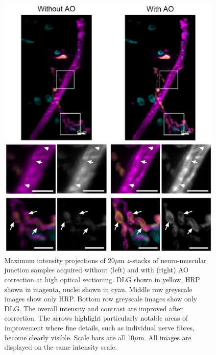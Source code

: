 \begin{figure}[h]
	\centering
	\includegraphics[width=\textwidth]{images/Aurox_NMJ_composite_grey_and_color.jpg}
	\caption[\textit{Drosophila} neuro-muscular junction data acquired on the Aurox imaging 
		system]{Maximum intensity projections of 20$\mu$m $z$-stacks of 
		neuro-muscular junction samples acquired without (left) and with 
		(right) AO correction at high optical sectioning. 
		DLG shown in yellow, HRP shown in magenta, nuclei shown in cyan. 
		Middle row greyscale images show only HRP. Bottom row greyscale 
		images show only DLG. The overall intensity and contrast are 
		improved after correction. The arrows highlight particularly 
		notable areas of improvement where fine details, such as 
		individual nerve fibres, become clearly visible. Scale bars are 
		all 10$\mu$m. All images are displayed on the same intensity 
		scale.}
	\label{fig:Aurox_NMJ_composite_grey_and_color}
\end{figure}
